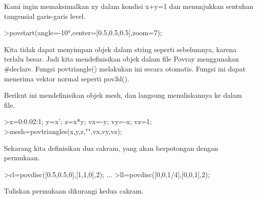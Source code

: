 \documentclass[a4paper,10pt]{article}
\begin{document}
\begin{eulernotebook}
\begin{eulercomment}
\begin{eulercomment}
\begin{eulercomment}
\begin{eulercomment}
\begin{eulercomment}
\begin{eulercomment}
\begin{eulercomment}
\begin{eulercomment}
\begin{eulercomment}
\begin{eulercomment}
\begin{eulercomment}
\begin{eulercomment}
\begin{eulercomment}
\begin{eulercomment}
\begin{eulercomment}
\begin{eulercomment}
\begin{eulercomment}
\begin{eulercomment}
\begin{eulercomment}
\begin{eulercomment}
\begin{eulercomment}
\begin{eulercomment}
\begin{eulercomment}
\begin{eulercomment}
\begin{eulercomment}
\begin{eulercomment}
\begin{eulercomment}
\begin{eulercomment}
\begin{eulercomment}
\begin{eulercomment}
\begin{eulercomment}
\begin{eulercomment}
\begin{eulercomment}
\begin{eulercomment}
\begin{eulercomment}
\begin{eulercomment}
\begin{eulercomment}
\begin{eulercomment}
\begin{eulercomment}
\begin{eulercomment}
\begin{eulercomment}
Kami ingin memaksimalkan xy dalam kondisi x+y=1 dan menunjukkan
sentuhan tangensial garis-garis level.
\end{eulercomment}
\begin{eulerprompt}
>povstart(angle=-10°,center=[0.5,0.5,0.5],zoom=7);
\end{eulerprompt}
\begin{eulercomment}
Kita tidak dapat menyimpan objek dalam string seperti sebelumnya,
karena terlalu besar. Jadi kita mendefinisikan objek dalam file Povray
menggunakan #declare. Fungsi povtriangle() melakukan ini secara
otomatis. Fungsi ini dapat menerima vektor normal seperti pov3d().

Berikut ini mendefinisikan objek mesh, dan langsung menuliskannya ke
dalam file.
\end{eulercomment}
\begin{eulerprompt}
>x=0:0.02:1; y=x'; z=x*y; vx=-y; vy=-x; vz=1;
>mesh=povtriangles(x,y,z,"",vx,vy,vz);
\end{eulerprompt}
\begin{eulercomment}
Sekarang kita definisikan dua cakram, yang akan berpotongan dengan
permukaan.
\end{eulercomment}
\begin{eulerprompt}
>cl=povdisc([0.5,0.5,0],[1,1,0],2); ...
>ll=povdisc([0,0,1/4],[0,0,1],2);
\end{eulerprompt}
\begin{eulercomment}
Tuliskan permukaan dikurangi kedua cakram.
\end{eulercomment}
\begin{eulerprompt}

\end{eulerprompt}
\end{eulercomment}
\end{eulercomment}
\end{eulercomment}
\end{eulercomment}
\end{eulercomment}
\end{eulercomment}
\end{eulercomment}
\end{eulercomment}
\end{eulercomment}
\end{eulercomment}
\end{eulercomment}
\end{eulercomment}
\end{eulercomment}
\end{eulercomment}
\end{eulercomment}
\end{eulercomment}
\end{eulercomment}
\end{eulercomment}
\end{eulercomment}
\end{eulercomment}
\end{eulercomment}
\end{eulercomment}
\end{eulercomment}
\end{eulercomment}
\end{eulercomment}
\end{eulercomment}
\end{eulercomment}
\end{eulercomment}
\end{eulercomment}
\end{eulercomment}
\end{eulercomment}
\end{eulercomment}
\end{eulercomment}
\end{eulercomment}
\end{eulercomment}
\end{eulercomment}
\end{eulercomment}
\end{eulercomment}
\end{eulercomment}
\end{eulercomment}
\end{eulernotebook}
\end{document}
